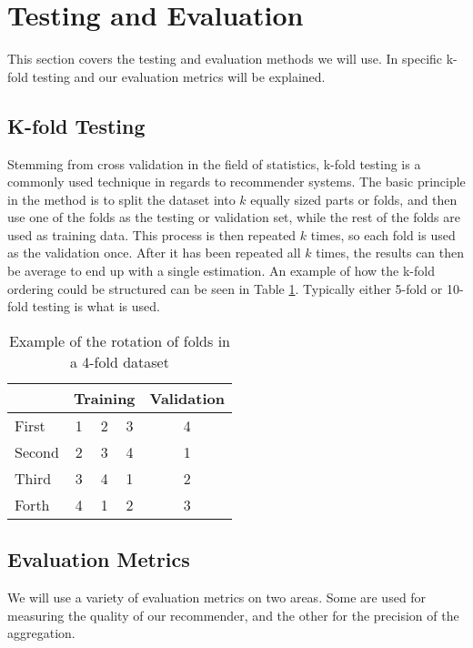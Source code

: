 \section{Testing and Evaluation}
This section covers the testing and evaluation methods we will use. In specific k-fold testing and our evaluation metrics will be explained.

\subsection{K-fold Testing}
Stemming from cross validation in the field of statistics, k-fold testing is a commonly used technique in regards to recommender systems. The basic principle in the method is to split the dataset into $k$ equally sized parts or folds, and then use one of the folds as the testing or validation set, while the rest of the folds are used as training data. This process is then repeated $k$ times, so each fold is used as the validation once. After it has been repeated all $k$ times, the results can then be average to end up with a single estimation. An example of how the k-fold ordering could be structured can be seen in Table \ref{tbl:bg_k-fold}. Typically either 5-fold or 10-fold testing is what is used.

\begin{table}[H]
	\centering
	\begin{tabular}{|l|c|c|c|c|}
		\hline
		& \multicolumn{3}{l|}{Training} & \multicolumn{1}{l|}{Validation} \\ \hline
		First  & 1        & 2        & 3       & 4                               \\ \hline
		Second & 2        & 3        & 4       & 1                               \\ \hline
		Third  & 3        & 4        & 1       & 2                               \\ \hline
		Forth  & 4        & 1        & 2       & 3                               \\ \hline
	\end{tabular}
	\caption{Example of the rotation of folds in a 4-fold dataset}
	\label{tbl:bg_k-fold}
\end{table}

\subsection{Evaluation Metrics}
We will use a variety of evaluation metrics on two areas. Some are used for measuring the quality of our recommender, and the other for the precision of the aggregation.
